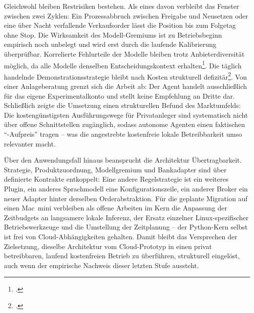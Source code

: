 Gleichwohl bleiben Restrisiken bestehen. Als eines davon verbleibt das Fenster zwischen zwei
Zyklen: Ein Prozessabbruch zwischen Freigabe und Neusetzen oder eine über Nacht verfallende
Verkaufsorder lässt die Position bis zum Folgetag ohne Stop. Die Wirksamkeit des
Modell-Gremiums ist zu Betriebsbeginn empirisch noch unbelegt und wird erst durch die
laufende Kalibrierung überprüfbar. Korrelierte Fehlurteile der Modelle bleiben trotz
Anbieterdiversität möglich, da alle Modelle denselben Entscheidungskontext
erhalten\footcites[vgl.][S.~617\,f.]{ladha1992}[vgl.][Kap.~8]{kuncheva2014}.
Die täglich handelnde Demonstrationsstrategie bleibt nach Kosten strukturell defizitär\footcite[vgl.][S.~773--806]{barberOdean2000}. Von einer
Anlageberatung grenzt sich die Arbeit ab: Der Agent handelt ausschließlich für
das eigene Experimentalkonto und stellt keine Empfehlung an Dritte dar. Schließlich zeigte
die Umsetzung einen strukturellen Befund des Marktumfelds: Die kostengünstigsten
Ausführungswege für Privatanleger sind systematisch nicht über offene Schnittstellen
zugänglich, sodass autonome Agenten einen faktischen \enquote{-Aufpreis}
tragen -- was die angestrebte kostenfreie lokale Betreibbarkeit umso relevanter macht.

Über den Anwendungsfall hinaus beansprucht die Architektur Übertragbarkeit.
Strategie, Produktzuordnung, Modellgremium und Bankadapter sind über definierte Kontrakte
entkoppelt: Eine andere Regelstrategie ist ein weiteres Plugin, ein anderes Sprachmodell
eine Konfigurationszeile, ein anderer Broker ein neuer Adapter hinter derselben
Orderabstraktion. Für die geplante Migration auf einen Mac~mini verbleiben als offene
Arbeiten im Kern die Anpassung der Zeitbudgets an langsamere lokale Inferenz, der Ersatz
einzelner Linux-spezifischer Betriebswerkzeuge und die Umstellung der Zeitplanung -- der
Python-Kern selbst ist frei von Cloud-Abhängigkeiten gehalten. Damit bleibt das Versprechen
der Zielsetzung, dieselbe Architektur vom Cloud-Prototyp in einen privat betreibbaren,
laufend kostenfreien Betrieb zu überführen, strukturell eingelöst, auch wenn der empirische
Nachweis dieser letzten Stufe aussteht.

